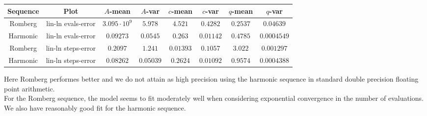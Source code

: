 \begin{table}[H]
    \centering
    \small
    \begin{tabular}{c|c||c|c|c|c|c|c}
Sequence & Plot & \(A\)-mean & \(A\)-var & \(c\)-mean & \(c\)-var & \(q\)-mean & \(q\)-var\\\hline
Romberg & lin-ln evals-error & \(3.095\cdot 10^9\) & \(5.978\) & \(4.521\) & \(0.4282\) & \(0.2537\) & \(0.04639\) \\
Harmonic & lin-ln evals-error & \(0.09273\) & \(0.0545\) & \(0.263\) & \(0.01142\) & \(0.4785\) & \(0.0004549\) \\
Romberg & lin-ln steps-error & \(0.2097\) & \(1.241\) & \(0.01393\) & \(0.1057\) & \(3.022\) & \(0.001297\) \\
Harmonic & lin-ln steps-error & \(0.08262\) & \(0.05039\) & \(0.2624\) & \(0.01092\) & \(0.9574\) & \(0.0004388\) \\
    \end{tabular}
    \label{tab:my_label}
\end{table}

Here Romberg performes better and we do not attain as high precision using the harmonic sequence in standard double precision floating point arithmetic.\\

For the Romberg sequence, the model seems to fit moderately well when considering exponential convergence in the number of evaluations. We also have reasonably good fit for the harmonic sequence.\\

